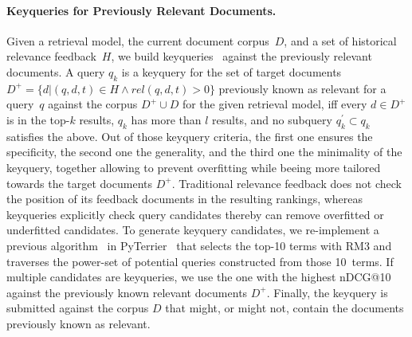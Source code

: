 \paragraph{Keyqueries for Previously Relevant Documents.} Given a retrieval model, the current document corpus~$D$, and a set of historical relevance feedback~$H$, we build keyqueries~\cite{froebe:2021c,gollub:2013a,hagen:2016b} against the previously relevant documents. A query $q_{k}$ is a keyquery for the set of target documents $D^{+} = \{d| (q,d,t) \in H \wedge rel(q,d,t) > 0\}$ previously known as relevant for a query~$q$ against the corpus $D^{+} \cup D$ for the given retrieval model, iff \Ni every $d \in D^{+}$ is in the top-$k$ results, \Nii $q_{k}$ has more than $l$ results, and \Niii no subquery $q^{'}_{k} \subset q_{k}$ satisfies the above. Out of those keyquery criteria, the first one ensures the specificity, the second one the generality, and the third one the minimality of the keyquery, together allowing to prevent overfitting while beeing more tailored towards the target documents $D^{+}$. Traditional relevance feedback does not check the position of its feedback documents in the resulting rankings, whereas keyqueries explicitly check query candidates thereby can remove overfitted or underfitted candidates. To generate keyquery candidates, we re-implement a previous algorithm~\cite{froebe:2022d} in PyTerrier~\cite{macdonald:2020} that selects the top-10 terms with RM3 and traverses the power-set of potential queries constructed from those 10~terms. If multiple candidates are keyqueries, we use the one with the highest nDCG@10 against the previously known relevant documents $D^{+}$. Finally, the keyquery is submitted against the corpus $D$ that might, or might not, contain the documents previously known as relevant.

